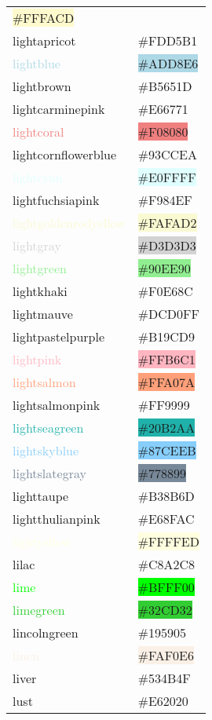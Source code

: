 \documentclass[
]{article}
\begin{document}
\begin{longtable}[]{@{}ll@{}}
\colorbox{lemonchiffon}{\#FFFACD}\tabularnewline
\textcolor{lightapricot}{lightapricot} &
\colorbox{lightapricot}{\#FDD5B1}\tabularnewline
\textcolor{lightblue}{lightblue} &
\colorbox{lightblue}{\#ADD8E6}\tabularnewline
\textcolor{lightbrown}{lightbrown} &
\colorbox{lightbrown}{\#B5651D}\tabularnewline
\textcolor{lightcarminepink}{lightcarminepink} &
\colorbox{lightcarminepink}{\#E66771}\tabularnewline
\textcolor{lightcoral}{lightcoral} &
\colorbox{lightcoral}{\#F08080}\tabularnewline
\textcolor{lightcornflowerblue}{lightcornflowerblue} &
\colorbox{lightcornflowerblue}{\#93CCEA}\tabularnewline
\textcolor{lightcyan}{lightcyan} &
\colorbox{lightcyan}{\#E0FFFF}\tabularnewline
\textcolor{lightfuchsiapink}{lightfuchsiapink} &
\colorbox{lightfuchsiapink}{\#F984EF}\tabularnewline
\textcolor{lightgoldenrodyellow}{lightgoldenrodyellow} &
\colorbox{lightgoldenrodyellow}{\#FAFAD2}\tabularnewline
\textcolor{lightgray}{lightgray} &
\colorbox{lightgray}{\#D3D3D3}\tabularnewline
\textcolor{lightgreen}{lightgreen} &
\colorbox{lightgreen}{\#90EE90}\tabularnewline
\textcolor{lightkhaki}{lightkhaki} &
\colorbox{lightkhaki}{\#F0E68C}\tabularnewline
\textcolor{lightmauve}{lightmauve} &
\colorbox{lightmauve}{\#DCD0FF}\tabularnewline
\textcolor{lightpastelpurple}{lightpastelpurple} &
\colorbox{lightpastelpurple}{\#B19CD9}\tabularnewline
\textcolor{lightpink}{lightpink} &
\colorbox{lightpink}{\#FFB6C1}\tabularnewline
\textcolor{lightsalmon}{lightsalmon} &
\colorbox{lightsalmon}{\#FFA07A}\tabularnewline
\textcolor{lightsalmonpink}{lightsalmonpink} &
\colorbox{lightsalmonpink}{\#FF9999}\tabularnewline
\textcolor{lightseagreen}{lightseagreen} &
\colorbox{lightseagreen}{\#20B2AA}\tabularnewline
\textcolor{lightskyblue}{lightskyblue} &
\colorbox{lightskyblue}{\#87CEEB}\tabularnewline
\textcolor{lightslategray}{lightslategray} &
\colorbox{lightslategray}{\#778899}\tabularnewline
\textcolor{lighttaupe}{lighttaupe} &
\colorbox{lighttaupe}{\#B38B6D}\tabularnewline
\textcolor{lightthulianpink}{lightthulianpink} &
\colorbox{lightthulianpink}{\#E68FAC}\tabularnewline
\textcolor{lightyellow}{lightyellow} &
\colorbox{lightyellow}{\#FFFFED}\tabularnewline
\textcolor{lilac}{lilac} & \colorbox{lilac}{\#C8A2C8}\tabularnewline
\textcolor{lime}{lime} & \colorbox{lime}{\#BFFF00}\tabularnewline
\textcolor{limegreen}{limegreen} &
\colorbox{limegreen}{\#32CD32}\tabularnewline
\textcolor{lincolngreen}{lincolngreen} &
\colorbox{lincolngreen}{\#195905}\tabularnewline
\textcolor{linen}{linen} & \colorbox{linen}{\#FAF0E6}\tabularnewline
\textcolor{liver}{liver} & \colorbox{liver}{\#534B4F}\tabularnewline
\textcolor{lust}{lust} & \colorbox{lust}{\#E62020}\tabularnewline

\end{longtable}
\end{document}
